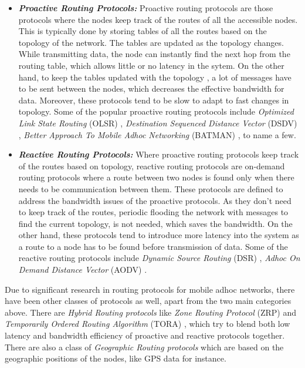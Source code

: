 \begin{itemize}
	\item{\textbf{\textit{Proactive Routing Protocols:}} Proactive routing protocols are those protocols where the nodes keep track of the routes of all the accessible nodes. This is typically done by storing tables of all the routes based on the topology of the network. The tables are updated as the topology changes. While transmitting data, the node can instantly find the next hop from the routing table, which allows little or no latency in the sytem. On the other hand, to keep the tables updated with the topology , a lot of messages have to be sent between the nodes, which decreases the effective bandwidth for data. Moreover, these protocols tend to be slow to adapt to fast changes in topology. Some of the popular proactive routing protocols include \textit{Optimized Link State Routing} (OLSR) \cite{olsr}, \textit{Destination Sequenced Distance Vector} (DSDV) \cite{dsdv}, \textit{Better Approach To Mobile Adhoc Networking} (BATMAN) \cite{batman}, to name a few. }

	\item{\textbf{\textit{Reactive Routing Protocols:}} Where proactive routing protocols keep track of the routes based on topology, reactive routing protocols are on-demand routing protocols where a route between two nodes is found only when there needs to be communication between them. These protocols are defined to address the bandwidth issues of the proactive protocols. As they don't need to keep track of the routes, periodic flooding the network with messages to find the current topology, is not needed, which saves the bandwidth. On the other hand, these protocols tend to introduce more latency into the system as a route to a node has to be found before transmission of data. Some of the reactive routing protocols include \textit{Dynamic Source Routing} (DSR) \cite{dsr}, \textit{Adhoc On Demand Distance Vector} (AODV) \cite{aodv}. }
\end{itemize}

Due to significant research in routing protocols for mobile adhoc networks, there have been other classes of protocols as well, apart from the two main categories above. There are \textit{Hybrid Routing protocols}  like \textit{Zone Routing Protocol} (ZRP) \cite{zrp} and \textit{Temporarily Ordered Routing Algorithm} (TORA) \cite{tora}, which try to blend both low latency and bandwidth efficiency of proactive and reactive protocols together. There are also a class of \textit{Geographic Routing protocols} \cite{130, 131, 132} which are based on the geographic positions of the nodes, like GPS data for instance.

